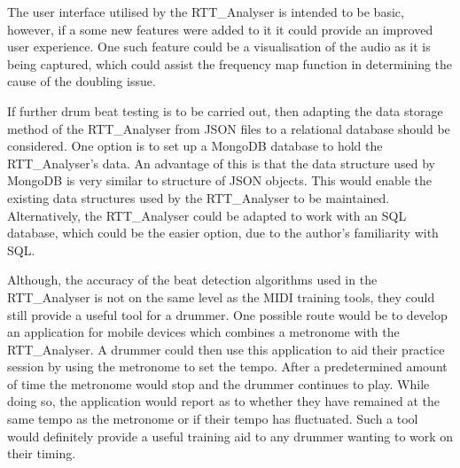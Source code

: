 \documentclass[a4paper, 11pt]{article}
\begin{document}
The user interface utilised by the RTT\_Analyser is intended to be basic, however, if a some new features were added to it it could provide an improved user experience. One such feature could be a visualisation of the audio as it is being captured, which could assist the frequency map function in determining the cause of the doubling issue.

If further drum beat testing is to be carried out, then adapting the data storage method of the RTT\_Analyser from JSON files to a relational database should be considered. One option is to set up a MongoDB\cite{mongo} database to hold the RTT\_Analyser's data. An advantage of this is that the data structure used by MongoDB is very similar to structure of JSON objects. This would enable the existing data structures used by the RTT\_Analyser to be maintained. Alternatively, the RTT\_Analyser could be adapted to work with an SQL database, which could be the easier option, due to the author's familiarity with SQL.\par  

Although, the accuracy of the beat detection algorithms used in the RTT\_Analyser is not on the same level as the MIDI training tools, they could still provide a useful tool for a drummer. One possible route would be to develop an application for mobile devices which combines a metronome with the RTT\_Analyser. A drummer could then use this application to aid their practice session by using the metronome to set the tempo. After a predetermined amount of time the metronome would stop and the drummer continues to play. While doing so, the application would report as to whether they have remained at the same tempo as the metronome or if their tempo has fluctuated. Such a tool would definitely provide a useful training aid to any drummer wanting to work on their timing.
\end{document}
